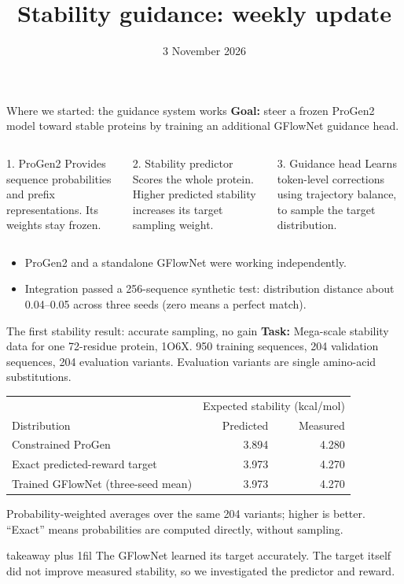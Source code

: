 \documentclass[10pt,aspectratio=169]{beamer}
\title{Stability guidance: weekly update}
\date{3 November 2026}
\renewcommand{\arraystretch}{1.17}
\newcommand{\takeaway}[1]{%
  \par\vspace{2mm}\vfill
  \begin{beamercolorbox}[wd=\textwidth,sep=2mm]{takeaway}
    \small\RaggedRight\leftskip=2mm\rightskip=2mm plus 1fil #1
  \end{beamercolorbox}
}
\begin{document}
\begin{frame}[t]{Where we started: the guidance system works}
\RaggedRight
\textbf{Goal:} steer a frozen ProGen2 model toward stable proteins by training
an additional GFlowNet guidance head.

\begin{columns}[T,onlytextwidth]
\RaggedRight
\begin{block}{1. ProGen2}
Provides sequence probabilities and prefix representations. Its weights stay frozen.
\end{block}
\RaggedRight
\begin{block}{2. Stability predictor}
Scores the whole protein. Higher predicted stability increases its target sampling weight.
\end{block}
\RaggedRight
\begin{block}{3. Guidance head}
Learns token-level corrections using trajectory balance, to sample the target distribution.
\end{block}
\end{columns}
\vspace{2mm}
\begin{itemize}
\item ProGen2 and a standalone GFlowNet were working independently.
\item Integration passed a 256-sequence synthetic test: distribution distance
about 0.04--0.05 across three seeds (zero means a perfect match).
\end{itemize}
\end{frame}

\begin{frame}[t]{The first stability result: accurate sampling, no gain}
\RaggedRight
\textbf{Task:} Mega-scale stability data for one 72-residue protein, 1O6X.
950 training sequences, 204 validation sequences, 204 evaluation variants.
Evaluation variants are single amino-acid substitutions.

\begin{center}
\renewcommand{\arraystretch}{1.2}
\begin{tabular}{lrr}
\toprule
 & \multicolumn{2}{c}{Expected stability (kcal/mol)}\\
Distribution & Predicted & Measured\\
\midrule
Constrained ProGen & 3.894 & 4.280\\
Exact predicted-reward target & 3.973 & 4.270\\
Trained GFlowNet (three-seed mean) & 3.973 & 4.270\\
\bottomrule
\end{tabular}
\end{center}
Probability-weighted averages over the same 204 variants; higher is better.
``Exact'' means probabilities are computed directly, without sampling.

\takeaway{The GFlowNet learned its target accurately. The target itself did not
improve measured stability, so we investigated the predictor and reward.}
\end{frame}
\end{document}
